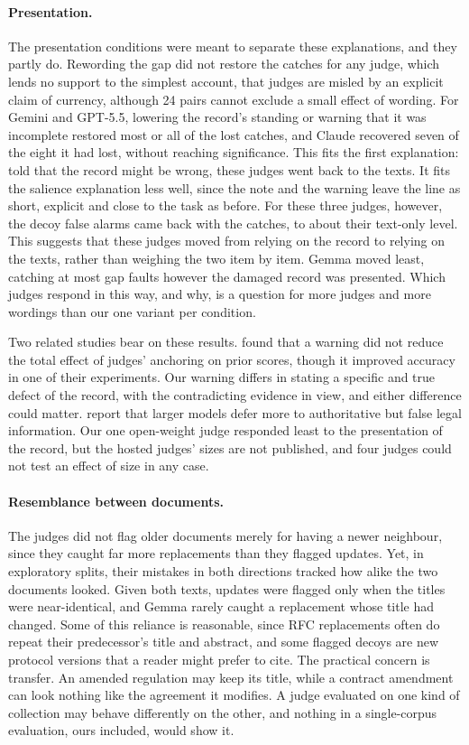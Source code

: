 \paragraph{Presentation.}
The presentation conditions were meant to separate these explanations, and they partly do. Rewording the gap did not
restore the catches for any judge, which lends no support to the simplest account, that judges are misled by an
explicit claim of currency, although 24 pairs cannot exclude a small effect of wording. For Gemini and GPT-5.5,
lowering the record's standing or warning that it was incomplete restored most or all of the lost catches, and Claude
recovered seven of the eight it had lost, without reaching significance. This fits the first explanation: told that the
record might be wrong, these judges went back to the texts. It fits the salience explanation less well, since the note
and the warning leave the line as short, explicit and close to the task as before. For these three judges, however,
the decoy false alarms came back with the catches, to about their text-only level. This suggests that these
judges moved from relying on the record to relying on the texts, rather than weighing the two item by item. Gemma moved least,
catching at most \EGemmaGapCaveat{} gap faults however the damaged record was presented. Which judges respond in this way,
and why, is a question for more judges and more wordings than our one variant per condition.

Two related studies bear on these results. \citet{kapetanovic2026anchoring} found that a warning did not
reduce the total effect of judges' anchoring on prior scores, though it improved accuracy in one of their experiments.
Our warning differs in stating a specific and true defect of the record, with the contradicting evidence in view, and
either difference could matter. \citet{molfetta2026sycophants} report that larger models defer
more to authoritative but false legal information. Our one open-weight judge responded least to the
presentation of the record, but the hosted judges' sizes are not published, and four judges could not test an effect
of size in any case.

\paragraph{Resemblance between documents.}
The judges did not flag older documents merely
for having a newer neighbour, since they caught far more replacements than they flagged updates. Yet, in exploratory splits, their mistakes in
both directions tracked how alike the two documents looked. Given both texts, updates were flagged only when the titles were
near-identical, and Gemma rarely caught a replacement whose title had changed. Some of this reliance is reasonable,
since RFC replacements often do repeat their predecessor's title and abstract, and some flagged decoys are new
protocol versions that a reader might prefer to cite. The practical concern is transfer. An amended regulation may keep
its title, while a contract amendment can look nothing like the agreement it modifies. A judge evaluated on one kind
of collection may behave differently on the other, and nothing in a single-corpus evaluation, ours included, would show
it.

